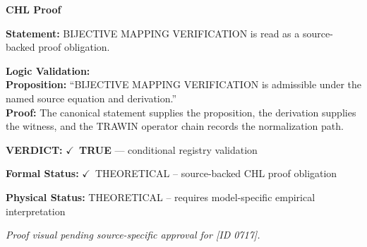 \vspace{0.45em}
\noindent\textbf{CHL Proof}\par
\textbf{Statement:} BIJECTIVE MAPPING VERIFICATION is read as a source-backed proof obligation.

\textbf{Logic Validation:}\\
\textbf{Proposition:} ``BIJECTIVE MAPPING VERIFICATION is admissible under the named source equation and derivation.''\\
\textbf{Proof:} The canonical statement supplies the proposition, the derivation supplies the witness, and the TRAWIN operator chain records the normalization path.

\textbf{VERDICT:} \ensuremath{\checkmark}\ \textbf{TRUE} --- conditional registry validation

\textbf{Formal Status:} \ensuremath{\checkmark}\ THEORETICAL -- source-backed CHL proof obligation

\textbf{Physical Status:} THEORETICAL -- requires model-specific empirical interpretation
\par\vspace{0.45em}
\par
\vfill
\begingroup\footnotesize\itshape
Proof visual pending source-specific approval for [ID 0717].
\par\endgroup
\vfill
\endgroup
\endgroup
